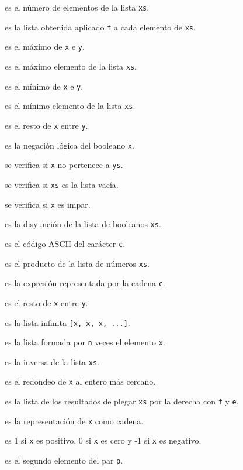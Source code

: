 \begin{enumerate*}
\item {} es el número de elementos de la lista \verb|xs|.
\item {} es la lista obtenida aplicado \verb|f| a cada elemento
  de \verb|xs|.
\item {} es el máximo de \verb|x| e \verb|y|.
\item {} es el máximo elemento de la lista \verb|xs|.
\item {} es el mínimo de \verb|x| e \verb|y|.
\item {} es el mínimo elemento de la lista \verb|xs|.
\item {} es el resto de \verb|x| entre \verb|y|.
\item {} es la negación lógica del booleano \verb|x|.
\item {} se verifica si \verb|x| no pertenece a \verb|ys|.
\item {} se verifica si \verb|xs| es la lista vacía.
\item {} se verifica si \verb|x| es impar.
\item {} es la disyunción de la lista de booleanos \verb|xs|.
\item {} es el código ASCII del carácter \verb|c|.
\item {} es el producto de la lista de números \verb|xs|.
\item {} es la expresión representada por la cadena \verb|c|.
\item {} es el resto de \verb|x| entre \verb|y|.
\item {} es la lista infinita \verb|[x, x, x, ...]|.
\item {} es la lista formada por \verb|n| veces el elemento
  \verb|x|. 
\item {} es la inversa de la lista \verb|xs|.
\item {} es el redondeo de \verb|x| al entero más cercano.
\item {} es la lista de los resultados de plegar \verb|xs|
  por la derecha con \verb|f| y \verb|e|.
\item {} es la representación de \verb|x| como cadena.
\item {} es 1 si \verb|x| es positivo, 0 si \verb|x| es cero y -1
  si \verb|x| es negativo.
\item {} es el segundo elemento del par \verb|p|.

\end{enumerate*}
